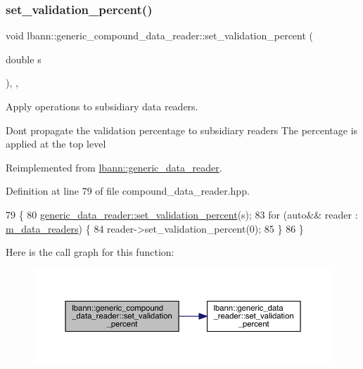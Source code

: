 \subsubsection{\texorpdfstring{set\+\_\+validation\+\_\+percent()}{set\_validation\_percent()}}
{\footnotesize\ttfamily void lbann\+::generic\+\_\+compound\+\_\+data\+\_\+reader\+::set\+\_\+validation\+\_\+percent (\begin{DoxyParamCaption}\item[{double}]{s }\end{DoxyParamCaption})\hspace{0.3cm}{\ttfamily [inline]}, {\ttfamily [override]}, {\ttfamily [virtual]}}



Apply operations to subsidiary data readers. 

Don\textquotesingle{}t propagate the validation percentage to subsidiary readers The percentage is applied at the top level 

Reimplemented from \hyperlink{classlbann_1_1generic__data__reader_a18b67bfa426eb4d2c8195d115c4df49f}{lbann\+::generic\+\_\+data\+\_\+reader}.



Definition at line 79 of file compound\+\_\+data\+\_\+reader.\+hpp.


\begin{DoxyCode}
79                                                  \{
80     \hyperlink{classlbann_1_1generic__data__reader_a18b67bfa426eb4d2c8195d115c4df49f}{generic\_data\_reader::set\_validation\_percent}(s);
83     \textcolor{keywordflow}{for} (\textcolor{keyword}{auto}&& reader : \hyperlink{classlbann_1_1generic__compound__data__reader_a9815e94ade5873415fd766e09d956d5b}{m\_data\_readers}) \{
84       reader->set\_validation\_percent(0);
85     \}
86   \}
\end{DoxyCode}
Here is the call graph for this function\+:\nopagebreak
\begin{figure}[H]
\begin{center}
\leavevmode
\includegraphics[width=350pt]{classlbann_1_1generic__compound__data__reader_a6b8288801972561d9758337c61eb39b8_cgraph}
\end{center}
\end{figure}


